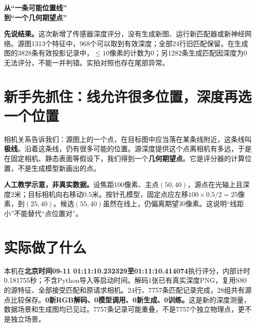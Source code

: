 \documentclass[UTF8,11pt,a4paper]{ctexart}
\begin{document}
\begin{center}{\LARGE\bfseries 从“一条可能位置线”\\到“一个几何期望点”}\par\vspace{.3em}{\large S81：加入真实源深度后的独立增补}\end{center}
\noindent\textbf{先说结果。}这次新增了传感器深度评分，没有生成新图、运行新匹配器或新神经网络。源图1313个特征中，968个可以取到有效深度；全部24行旧匹配保留。在生成图的3828条有效投影记录中，$\le10$像素的计数为0；另1282条生成匹配因深度为0无法评分，不能一并判错。实拍对照也存在尾部异常。


\section{ 新手先抓住：线允许很多位置，深度再选一个位置}
相机关系告诉我们：源图上的一个点，在目标图中应当落在某条线附近，这条线叫\textbf{极线}。沿着这条线，仍有很多可能的位置。源深度提供这个点离相机有多远，于是在固定相机、静态表面等假设下，我们得到一个\textbf{几何期望点}。它是评分器的计算位置，不是生成模型新画出的点。

\begin{center}
\end{center}
\noindent\textbf{人工教学示意，非真实数据。}设焦距100像素、主点$(50,40)$，源点在光轴上且深度2米；目标相机向右移动0.5米。按针孔模型，固定点应左移$100\times0.5/2=25$像素，到$(25,40)$。候选$(55,40)$虽然在线上，仍偏离期望30像素。这说明“线距小”不能替代“点位置对”。

\section{ 实际做了什么}
本机在\textbf{北京时间09-11 01:11:10.232329至01:11:10.414074}执行评分，内部计时0.181755秒；不含Python导入等启动时间。解码1张已有真实深度PNG，复用S80的源特征、全部接受匹配和原请求相机。24行、7757条匹配记录完成，28组共有源点比较保存。\textbf{0新RGB解码、0模型调用、0新生成、0训练。}这是新的深度测量，数据场景和生成图均已见过。7757条记录可能重叠，不是7757个独立物理点，更不是独立场景。
\clearpage
\end{document}
